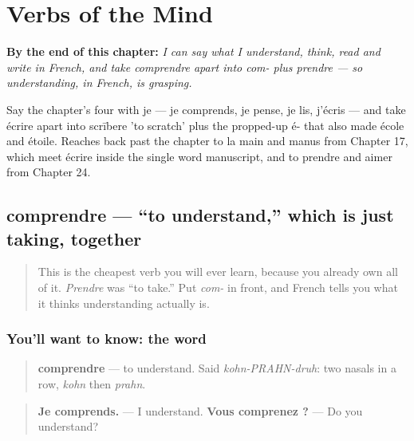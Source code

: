 
\chapter{Verbs of the Mind}
\label{ch:fr-verbs-of-the-mind}

\begin{chapteropening}
\textbf{By the end of this chapter:} \emph{I can say what I understand, think, read and write in French, and take comprendre apart into com- plus prendre — so understanding, in French, is grasping.}

Say the chapter's four with je — je comprends, je pense, je lis, j'écris — and take écrire apart into scrībere 'to scratch' plus the propped-up é- that also made école and étoile. Reaches back past the chapter to la main and manus from Chapter 17, which meet écrire inside the single word manuscript, and to prendre and aimer from Chapter 24.
\end{chapteropening}

\section[comprendre]{comprendre — \textquotedblleft{}to understand,\textquotedblright{} which is just taking, together}

\label{lesson:FR-C25-comprendre}



\begin{quote}
This is the cheapest verb you will ever learn, because you already own all of it. \emph{Prendre} was \textquotedblleft{}to take.\textquotedblright{} Put \emph{com-} in front, and French tells you what it thinks understanding actually is.
\end{quote}

\subsection*{You'll want to know: the word}
\begin{quote}
\textbf{comprendre} — to understand. Said \emph{kohn-PRAHN-druh}: two nasals in a row, \emph{kohn} then \emph{prahn}.
\end{quote}

\begin{quote}
\textbf{Je comprends.} — I understand. \textbf{Vous comprenez ?} — Do you understand?
\end{quote}

